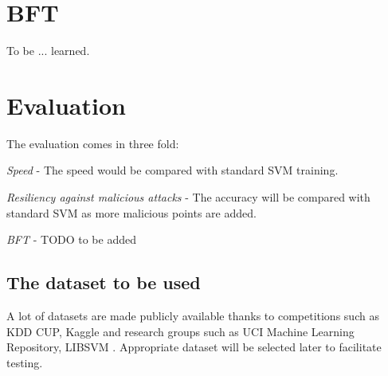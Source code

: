 \documentclass[10pt,conference,compsocconf,letterpaper]{IEEEtran}
\begin{document}
\section{BFT}

To be ... learned.

\section{Evaluation}

The evaluation comes in three fold:

\textit{Speed} - The speed would be compared with standard SVM training.

\textit{Resiliency against malicious attacks} - The accuracy will be compared with standard SVM as more malicious points are added.

\textit{BFT} - TODO to be added


\subsection{The dataset to be used}
A lot of datasets are made publicly available thanks to competitions such as KDD CUP, Kaggle and research groups such as UCI Machine Learning Repository, LIBSVM \cite{kddcup,kaggle,uci,libsvm}. Appropriate dataset will be selected later to facilitate testing.
\end{document}
